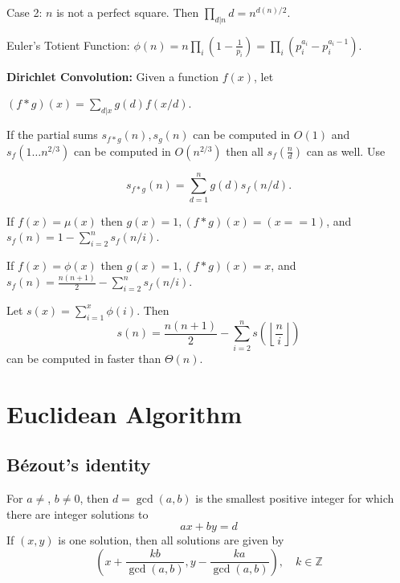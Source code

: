 	Case 2: $n$ is not a perfect square. Then $\prod_{d|n} d = n^{d(n)/2}$.	
	
	Euler's Totient Function: $\phi(n) = n \prod_{i} (1 - \frac{1}{p_i}) = \prod_{i} (p_i^{a_i} - p_i^{a_i-1})$.	

	\textbf{Dirichlet Convolution:} Given a function $f(x)$, let 

	$(f*g)(x)=\sum_{d|x}g(d)f(x/d)$. 

	If the partial sums $s_{f*g}(n),s_g(n)$ can be computed in $O(1)$ and $s_f(1\ldots n^{2/3})$ can be computed in $O\left(n^{2/3}\right)$ then all $s_f\left(\frac{n}{d}\right)$ can as well. Use

	$$s_{f*g}(n)=\sum_{d=1}^ng(d)s_f(n/d).$$ 

	
	If $f(x)=\mu(x)$ then $g(x)=1, (f*g)(x)=(x == 1)$, and $s_f(n)=1-\sum_{i=2}^ns_f(n/i)$.

	If $f(x)=\phi(x)$ then $g(x)=1, (f*g)(x)=x$, and $s_f(n)=\frac{n(n+1)}{2}-\sum_{i=2}^ns_f(n/i).$


	Let $s(x)=\sum_{i=1}^x\phi(i).$ Then 
	$$s(n)=\frac{n(n+1)}{2}-\sum_{i=2}^ns\left(\left\lfloor\frac{n}{i}\right\rfloor\right)$$
	can be computed in faster than $\Theta(n)$.
	

\section{Euclidean Algorithm}

	\subsection{Bézout's identity}
	For $a \neq $, $b \neq 0$, then $d=\gcd(a,b)$ is the smallest positive integer for which there are integer solutions to
	$$ax+by=d$$
	If $(x,y)$ is one solution, then all solutions are given by
	$$\left(x+\frac{kb}{\gcd(a,b)}, y-\frac{ka}{\gcd(a,b)}\right), \quad k\in\mathbb{Z}$$

	
